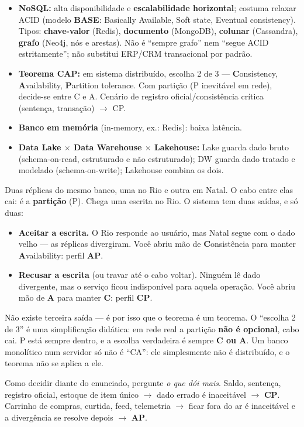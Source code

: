 \begin{itemize}
\item \textbf{NoSQL:} alta disponibilidade e \textbf{escalabilidade
horizontal}; costuma relaxar ACID (modelo \textbf{BASE}: Basically
Available, Soft state, Eventual consistency). Tipos: \textbf{chave-valor}
(Redis), \textbf{documento} (MongoDB), \textbf{colunar} (Cassandra),
\textbf{grafo} (Neo4j, nós e arestas). Não é ``sempre grafo'' nem ``segue
ACID estritamente''; não substitui ERP/CRM transacional por padrão.
\item \textbf{Teorema CAP:} em sistema distribuído, escolha 2 de 3 ---
\textbf{C}onsistency, \textbf{A}vailability, \textbf{P}artition tolerance.
Com partição (P inevitável em rede), decide-se entre C e A. Cenário de
registro oficial/consistência crítica (sentença, transação) $\to$ CP.
\item \textbf{Banco em memória} (in-memory, ex.: Redis): baixa latência.
\item \textbf{Data Lake $\times$ Data Warehouse $\times$ Lakehouse:} Lake
guarda dado bruto (schema-on-read, estruturado e não estruturado); DW guarda
dado tratado e modelado (schema-on-write); Lakehouse combina os dois.
\end{itemize}

\begin{conceito}
Duas réplicas do mesmo banco, uma no Rio e outra em Natal. O cabo entre elas
cai: é a \textbf{partição} (P). Chega uma escrita no Rio. O sistema tem duas
saídas, e só duas:

\begin{itemize}
\item \textbf{Aceitar a escrita.} O Rio responde ao usuário, mas Natal segue
com o dado velho --- as réplicas divergiram. Você abriu mão de
\textbf{C}onsistência para manter \textbf{A}vailability: perfil \textbf{AP}.
\item \textbf{Recusar a escrita} (ou travar até o cabo voltar). Ninguém lê
dado divergente, mas o serviço ficou indisponível para aquela operação. Você
abriu mão de \textbf{A} para manter \textbf{C}: perfil \textbf{CP}.
\end{itemize}

Não existe terceira saída --- é por isso que o teorema é um teorema. O
``escolha 2 de 3'' é uma simplificação didática: em rede real a partição
\textbf{não é opcional}, cabo cai. P está sempre dentro, e a escolha
verdadeira é sempre \textbf{C ou A}. Um banco monolítico num servidor só não é
``CA'': ele simplesmente não é distribuído, e o teorema não se aplica a ele.

Como decidir diante do enunciado, pergunte \emph{o que dói mais}. Saldo,
sentença, registro oficial, estoque de item único $\to$ dado errado é
inaceitável $\to$ \textbf{CP}. Carrinho de compras, curtida, feed, telemetria
$\to$ ficar fora do ar é inaceitável e a divergência se resolve depois $\to$
\textbf{AP}.
\end{conceito}

